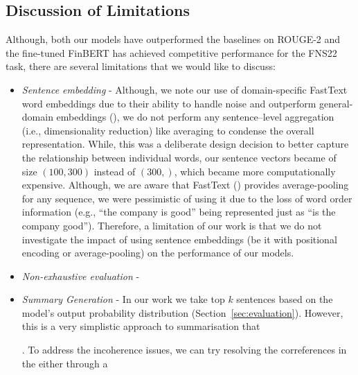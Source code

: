 \subsection{Discussion of Limitations}\label{subsec:limitations}
Although, both our models have outperformed the baselines on ROUGE-2 and the fine-tuned FinBERT has achieved competitive
performance for the FNS22 task, there are several limitations that we would like to discuss:
\begin{itemize}
    \item \emph{Sentence embedding} - Although, we note our use of domain-specific FastText word embeddings due to their
    ability to handle noise and outperform general-domain embeddings (\cite{rahimikia2021realised}), we do not perform
    any sentence--level aggregation (i.e., dimensionality reduction) like averaging to condense the overall representation.
    While, this was a deliberate design decision to better capture the relationship between individual words,
    our sentence vectors became of size $(100, 300)$ instead of $(300,)$, which became more computationally expensive.
    Although, we are aware that FastText (\cite{bojanowski-etal-2017-enriching}) provides average-pooling for any sequence,
    we were pessimistic of using it due to the loss of word order information (e.g., ``the company is good'' being represented just as ``is the company good'').
    Therefore, a limitation of our work is that we do not investigate the impact of using sentence embeddings
    (be it with positional encoding or average-pooling) on the performance of our models.
    \item \emph{Non-exhaustive evaluation} -
    \item \emph{Summary Generation} - In our work we take top $k$ sentences based on the model's output probability distribution (Section~\ref{sec:evaluation}).
        However, this is a very simplistic approach to summarisation that
        .
        To address the incoherence issues, we can try resolving the correferences in the either through a

\end{itemize}
